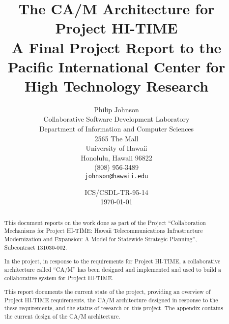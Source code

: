 



\pagestyle{headings}



\title{{\bf The CA/M Architecture for Project HI-TIME\\
       {\small A Final Project Report to the 
       Pacific International Center for High Technology Research}}}
       

\author{Philip Johnson\\ 
        Collaborative Software Development Laboratory\\
        Department of Information and Computer Sciences\\ 
        2565 The Mall\\ 
        University of Hawaii\\ 
        Honolulu, Hawaii 96822\\ 
        (808) 956-3489\\
        {\tt johnson@hawaii.edu}}

\date{ICS/CSDL-TR-95-14 \\ \today}

\maketitle

\newpage
\vfill
\tableofcontents
\vfill
\newpage

\vfill
\begin{abstract}

This document reports on the work done as part of the Project
``Collaboration Mechanisms for Project HI-TIME: Hawaii Telecommunications
Infrastructure Modernization and Expansion: A Model for Statewide
Strategic Planning'', Subcontract 131030-002.  

In the project, in response to the requirements for Project HI-TIME, a
collaborative architecture called ``CA/M'' has been designed and
implemented and used to build a collaborative system for Project
HI-TIME.  

This report documents the current state of the project, providing an
overview of Project HI-TIME requirements, the CA/M architecture designed
in response to the these requirements, and the status of research on 
this project.  The appendix contains the current design of the CA/M
architecture. 

\end{abstract}

